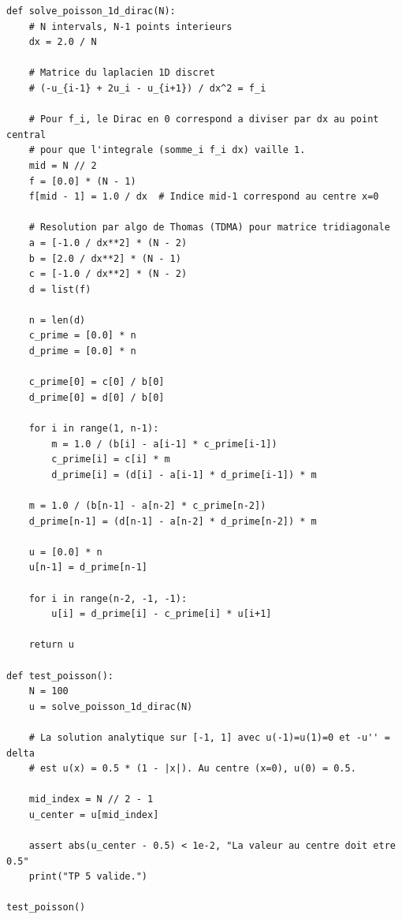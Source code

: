 \documentclass[11pt,a4paper]{article}
\begin{document}
\begin{lstlisting}
def solve_poisson_1d_dirac(N):
    # N intervals, N-1 points interieurs
    dx = 2.0 / N

    # Matrice du laplacien 1D discret
    # (-u_{i-1} + 2u_i - u_{i+1}) / dx^2 = f_i

    # Pour f_i, le Dirac en 0 correspond a diviser par dx au point central
    # pour que l'integrale (somme_i f_i dx) vaille 1.
    mid = N // 2
    f = [0.0] * (N - 1)
    f[mid - 1] = 1.0 / dx  # Indice mid-1 correspond au centre x=0

    # Resolution par algo de Thomas (TDMA) pour matrice tridiagonale
    a = [-1.0 / dx**2] * (N - 2)
    b = [2.0 / dx**2] * (N - 1)
    c = [-1.0 / dx**2] * (N - 2)
    d = list(f)

    n = len(d)
    c_prime = [0.0] * n
    d_prime = [0.0] * n

    c_prime[0] = c[0] / b[0]
    d_prime[0] = d[0] / b[0]

    for i in range(1, n-1):
        m = 1.0 / (b[i] - a[i-1] * c_prime[i-1])
        c_prime[i] = c[i] * m
        d_prime[i] = (d[i] - a[i-1] * d_prime[i-1]) * m

    m = 1.0 / (b[n-1] - a[n-2] * c_prime[n-2])
    d_prime[n-1] = (d[n-1] - a[n-2] * d_prime[n-2]) * m

    u = [0.0] * n
    u[n-1] = d_prime[n-1]

    for i in range(n-2, -1, -1):
        u[i] = d_prime[i] - c_prime[i] * u[i+1]

    return u

def test_poisson():
    N = 100
    u = solve_poisson_1d_dirac(N)

    # La solution analytique sur [-1, 1] avec u(-1)=u(1)=0 et -u'' = delta
    # est u(x) = 0.5 * (1 - |x|). Au centre (x=0), u(0) = 0.5.

    mid_index = N // 2 - 1
    u_center = u[mid_index]

    assert abs(u_center - 0.5) < 1e-2, "La valeur au centre doit etre 0.5"
    print("TP 5 valide.")

test_poisson()
\end{lstlisting}
\end{document}
